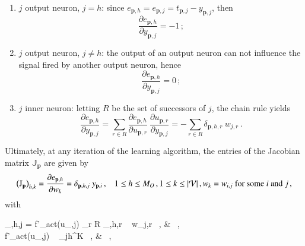 \documentclass{elsarticle}
\numberwithin{equation}{section}
\theoremstyle{theorem}
\theoremstyle{definition}
\theoremstyle{remark}
\theoremstyle{proposition}
\numberwithin{figure}{section}
\begin{document}
		\begin{enumerate}[label=(\roman*)]
			\item $j$ output neuron, $j = h$: since $e_{\mathbf{p},h} = e_{\mathbf{p},j} = t_{\mathbf{p},j} - y_{\mathbf{p},j}$, then 
			\begin{equation*}
				\label{eq:jacobian-first-case}
				\dfrac{\partial e_{\mathbf{p},h}}{\partial y_{\mathbf{p},j}} = -1 \, ;
			\end{equation*}
			\item $j$ output neuron, $j \neq h$: the output of an output neuron can not influence the signal fired by another output neuron, hence 
			\begin{equation*}
				\label{eq:jacobian-second-case}
				\dfrac{\partial e_{\mathbf{p},h}}{\partial y_{\mathbf{p},j}} = 0 \, ;
			\end{equation*}
			\item $j$ inner neuron: letting $R$ be the set of successors of $j$, the chain rule yields
			\begin{equation*}
				\label{eq:jacobian-third-case}
				\dfrac{\partial e_{\mathbf{p},h}}{\partial y_{\mathbf{p},j}} = \sum_{r \in R} \dfrac{\partial e_{\mathbf{p},h}}{\partial u_{\mathbf{p},r}} ~ \dfrac{\partial u_{\mathbf{p},r}}{\partial y_{\mathbf{p},j}} = - \sum_{r \in R} \delta_{\mathbf{p},h,r} ~ w_{j,r} \, .
			\end{equation*}
		\end{enumerate}
		Ultimately, at any iteration of the learning algorithm, the entries of the Jacobian matrix $\mathbb{J}_{\mathbf{p}}$ are given by
		\begin{equation*}
			\big( \mathbb{J}_{\mathbf{p}} \big)_{h,k} = \dfrac{\partial e_{\mathbf{p},h}}{\partial w_k} = \delta_{\mathbf{p},h,j} ~ y_{\mathbf{p},i} \, , \hspace*{0.3cm} 1 \leq h \leq M_O \, , 1 \leq k \leq |\mathcal{V}| \, , \text{$w_k = w_{i,j}$ for some $i$ and $j$} \, ,
		\end{equation*}
		with
		\begin{subnumcases}{\delta_{,h,j} =}
			\label{eq:levenberg-marquardt-inner-neuron}
		   	f'_{act}(u_{,j}) \sum_{r \in R} \delta_{,h,r} ~ w_{j,r} \, , &  \, , \\
		   	\label{eq:levenberg-marquardt-output-neuron}
			f'_{act}(u_{,j}) ~ \delta_{jh}^K \, , &  \, ,
		\end{subnumcases}
\end{document}
